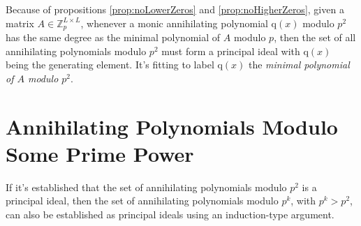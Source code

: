 \documentclass[a4paper, 12pt, reqno]{amsart}
\begin{document}
		Because of propositions \ref{prop:noLowerZeros} and \ref{prop:noHigherZeros}, given a matrix $A \in \mathds{Z}_{p}^{L \times L}$, whenever a monic annihilating 
		polynomial q$(x)$ modulo $p^2$ has the same degree as the minimal polynomial of $A$ modulo $p$, then the set of all annihilating polynomials modulo $p^2$ must form
		a principal ideal with q$(x)$ being the generating element. It's fitting to label q$(x)$ the \emph{minimal polynomial of $A$ modulo $p^2$}.
		
	\section{Annihilating Polynomials Modulo Some Prime Power}
		
		If it's established that the set of annihilating polynomials modulo $p^2$ is a principal ideal, then the set of annihilating polynomials modulo $p^k$, with
		$p^k > p^2$, can also be established as principal ideals using an induction-type argument.
		
\end{document}
